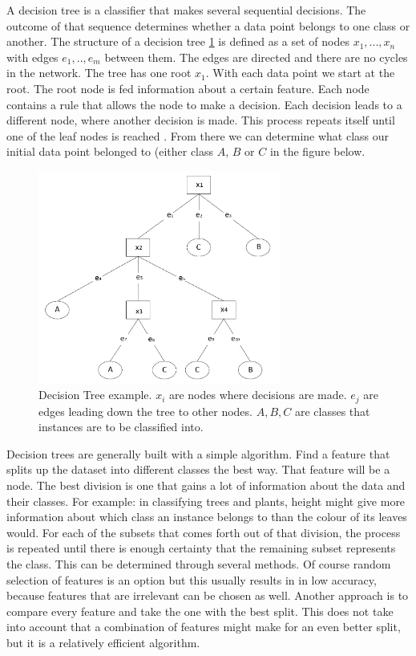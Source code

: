 A decision tree is a classifier that makes several sequential decisions. The outcome of that sequence determines whether a data point belongs to one class or another. The structure of a decision tree \ref{fig:DT} is defined as a set of nodes ${x_1, ... , x_n}$ with edges ${e_1, .., e_{m}}$ between them. The edges are directed and there are no cycles in the network. The tree has one root $x_1$. With each data point we start at the root. The root node is fed information about a certain feature. Each node contains a rule that allows the node to make a decision. Each decision leads to a different node, where another decision is made. This process repeats itself until one of the leaf nodes is reached \cite{safavian1991survey}. From there we can determine what class our initial data point belonged to (either class $A$, $B$ or $C$ in the figure below. 
\begin{figure}[H]
    \includegraphics[width=80mm]{./img/decisiontree.png}
    \caption{Decision Tree example. $x_i$ are nodes where decisions are made. $e_j$ are edges leading down the tree to other nodes. $A,B,C$ are classes that instances are to be classified into.}
    \label{fig:DT}
\end{figure}

Decision trees are generally built with a simple algorithm. Find a feature that splits up the dataset into different classes the best way. That feature will be a node. The best division is one that gains a lot of information about the data and their classes. For example: in classifying trees and plants, height might give more information about which class an instance belongs to than the colour of its leaves would. For each of the subsets that comes forth out of that division, the process is repeated until there is enough certainty that the remaining subset represents the class. This can be determined through several methods. Of course random selection of features is an option but this usually results in in low accuracy, because features that are irrelevant can be chosen as well. Another approach is to compare every feature and take the one with the best split. This does not take into account that a combination of features might make for an even better split, but it is a relatively efficient algorithm. 

